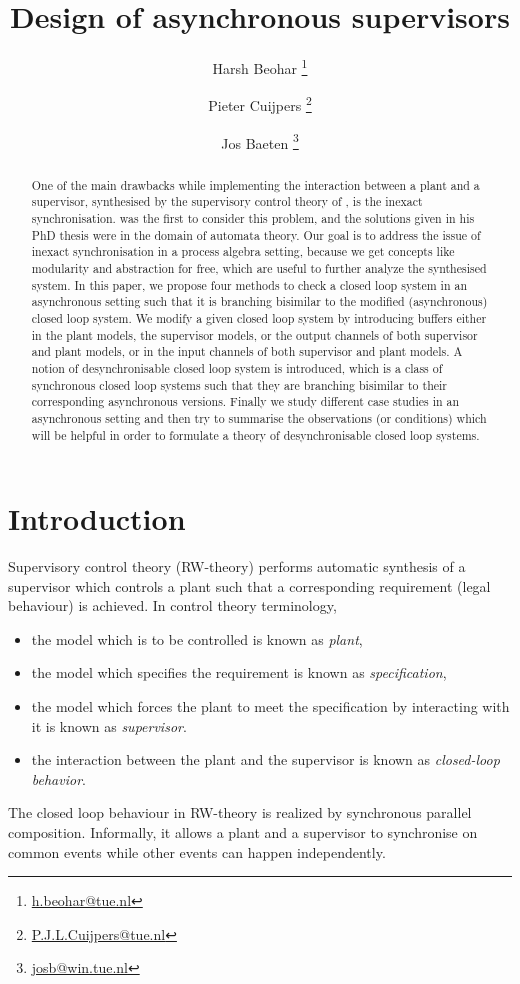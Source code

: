 \documentclass[a4paper,english,final]{article}
\title{Design of asynchronous supervisors}
\author{Harsh Beohar \thanks{\protect\url{h.beohar@tue.nl}}
\and Pieter Cuijpers \thanks{\protect\url{P.J.L.Cuijpers@tue.nl}}
 \and Jos Baeten \thanks{\protect\url{josb@win.tue.nl}}}
\theoremstyle{plain}
\theoremstyle{definition}
\begin{document}
\maketitle

\begin{abstract}
One of the main drawbacks while implementing the interaction between a plant and a supervisor, synthesised by the supervisory control theory of \citeauthor{RW:1987}, is the inexact synchronisation. \citeauthor{balemiphdt} was the first to consider this problem, and the solutions given in his PhD thesis were in the domain of automata theory. Our goal is to address the issue of inexact synchronisation in a process algebra setting, because we get concepts like modularity and abstraction for free, which are useful to further analyze the synthesised system. In this paper, we propose four methods to check a closed loop system in an asynchronous setting such that it is branching bisimilar to the modified (asynchronous) closed loop system. We modify a given closed loop system by introducing buffers either in the plant models, the supervisor models, or the output channels of both supervisor and plant models, or in the input channels of both supervisor and plant models. A notion of desynchronisable closed loop system is introduced, which is a class of synchronous closed loop systems such that they are branching bisimilar to their corresponding asynchronous versions. Finally we study different case studies in an asynchronous setting and then try to summarise the observations (or conditions) which will be helpful in order to formulate a theory of desynchronisable closed loop systems.
\end{abstract}

\section{Introduction}\label{intro}
Supervisory control theory (RW-theory) \citep{RW:1987,RW:1989} performs automatic synthesis of a supervisor which controls a plant such that a corresponding requirement (legal behaviour) is achieved. In control theory terminology,
\begin{itemize}
\item the model which is to be controlled is known as \textit{plant},
\item the model which specifies the requirement is known as \textit{specification},
\item the model which forces the plant to meet the specification by interacting with it is known as \textit{supervisor}.
\item the interaction between the plant and the supervisor is known as \textit{closed-loop behavior}.
\end{itemize}
The closed loop behaviour in RW-theory is realized by synchronous parallel composition. Informally, it allows a plant and a supervisor to synchronise on common events while other events can happen independently.
\end{document}
